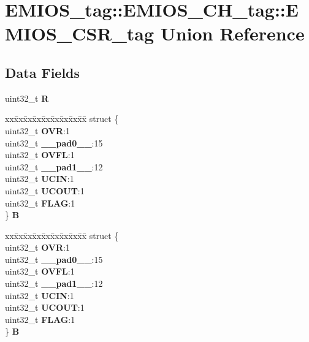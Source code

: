 \hypertarget{unionEMIOS__tag_1_1EMIOS__CH__tag_1_1EMIOS__CSR__tag}{}\section{E\+M\+I\+O\+S\+\_\+tag\+::E\+M\+I\+O\+S\+\_\+\+C\+H\+\_\+tag\+::E\+M\+I\+O\+S\+\_\+\+C\+S\+R\+\_\+tag Union Reference}
\label{unionEMIOS__tag_1_1EMIOS__CH__tag_1_1EMIOS__CSR__tag}
\subsection*{Data Fields}
\begin{DoxyCompactItemize}
\item 
\mbox{\label{unionEMIOS__tag_1_1EMIOS__CH__tag_1_1EMIOS__CSR__tag_a2451dc043618fd902c17bfd1b9cff0c3}} 
uint32\+\_\+t {\bfseries R}
\item 
\mbox{\label{unionEMIOS__tag_1_1EMIOS__CH__tag_1_1EMIOS__CSR__tag_aaeae50da226095e6f3c037039f65d156}} 
\begin{tabbing}
xx\=xx\=xx\=xx\=xx\=xx\=xx\=xx\=xx\=\kill
struct \{\\
\>uint32\_t {\bfseries OVR}:1\\
\>uint32\_t {\bfseries \_\_pad0\_\_}:15\\
\>uint32\_t {\bfseries OVFL}:1\\
\>uint32\_t {\bfseries \_\_pad1\_\_}:12\\
\>uint32\_t {\bfseries UCIN}:1\\
\>uint32\_t {\bfseries UCOUT}:1\\
\>uint32\_t {\bfseries FLAG}:1\\
\} {\bfseries B}\\

\end{tabbing}\item 
\mbox{\label{unionEMIOS__tag_1_1EMIOS__CH__tag_1_1EMIOS__CSR__tag_a7c8efaef5719f5237ebbb18e52d0efb7}} 
\begin{tabbing}
xx\=xx\=xx\=xx\=xx\=xx\=xx\=xx\=xx\=\kill
struct \{\\
\>uint32\_t {\bfseries OVR}:1\\
\>uint32\_t {\bfseries \_\_pad0\_\_}:15\\
\>uint32\_t {\bfseries OVFL}:1\\
\>uint32\_t {\bfseries \_\_pad1\_\_}:12\\
\>uint32\_t {\bfseries UCIN}:1\\
\>uint32\_t {\bfseries UCOUT}:1\\
\>uint32\_t {\bfseries FLAG}:1\\
\} {\bfseries B}\\


\end{tabbing}
\end{DoxyCompactItemize}
